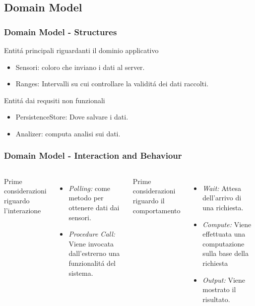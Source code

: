 \documentclass{beamer}
\begin{document}

\subsection{Domain Model}

\begin{frame}
  \frametitle{Domain Model - Structures}
  Entit\'a principali riguardanti il dominio applicativo
  \begin{itemize}
    \item Sensori: coloro che inviano i dati al server.
    \item Ranges: Intervalli su cui controllare la validit\'a  dei dati raccolti.
  \end{itemize}
  Entit\'a dai requsiti non funzionali
  \begin{itemize}
    \item PersistenceStore: Dove salvare i dati.
    \item Analizer: computa analisi sui dati.
  \end{itemize}
\end{frame}

\begin{frame}
  \frametitle{Domain Model - Interaction and Behaviour}
  \begin{columns}[c] %
      Prime considerazioni riguardo l'interazione
    \begin{itemize}
      \item \textit{Polling:} come metodo per ottenere dati dai sensori.
      \item \textit{Procedure Call:} Viene invocata dall'estrerno una funzionalit\'a del sistema.
    \end{itemize}
      Prime considerazioni riguardo il comportamento
    \begin{itemize}
      \item \textit{Wait:} Attesa dell'arrivo di una richiesta.
      \item \textit{Compute:} Viene effettuata una computazione sulla base della richiesta
      \item \textit{Output:} Viene mostrato il risultato.
    \end{itemize}
  \end{columns}
\end{frame}
\end{document}

